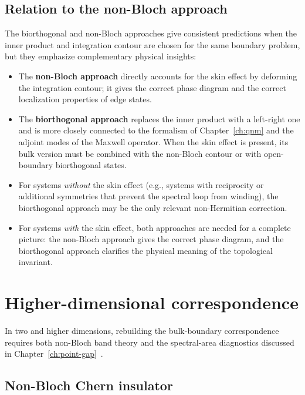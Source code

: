 \subsection{Relation to the non-Bloch approach}
\label{ssec:bbc-comparison}

The biorthogonal and non-Bloch approaches give consistent predictions
when the inner product and integration contour are chosen for the same
boundary problem, but they emphasize complementary physical insights:
\begin{itemize}
 \item The \textbf{non-Bloch approach} directly accounts for the
 skin effect by deforming the integration contour; it gives the
 correct phase diagram and the correct localization properties
 of edge states.
 \item The \textbf{biorthogonal approach} replaces the inner product
 with a left-right one and is more closely connected to the formalism
 of Chapter~\ref{ch:qnm} and the adjoint modes of the Maxwell operator.
 When the skin effect is present, its bulk version must be combined
 with the non-Bloch contour or with open-boundary biorthogonal states.
 \item For systems \emph{without} the skin effect (e.g., systems with
 reciprocity or additional symmetries that prevent the spectral
 loop from winding), the biorthogonal approach may be the only
 relevant non-Hermitian correction.
 \item For systems \emph{with} the skin effect, both approaches are
 needed for a complete picture: the non-Bloch approach gives the
 correct phase diagram, and the biorthogonal approach clarifies
 the physical meaning of the topological invariant.
\end{itemize}


\section{Higher-dimensional correspondence}
\label{sec:bbc-higher-d}

In two and higher dimensions, rebuilding the bulk-boundary
correspondence requires both non-Bloch band theory and the spectral-area
diagnostics discussed in Chapter~\ref{ch:point-gap}~\cite{zhang2022universal}.

\subsection{Non-Bloch Chern insulator}
\label{ssec:non-bloch-chern-insulator}

